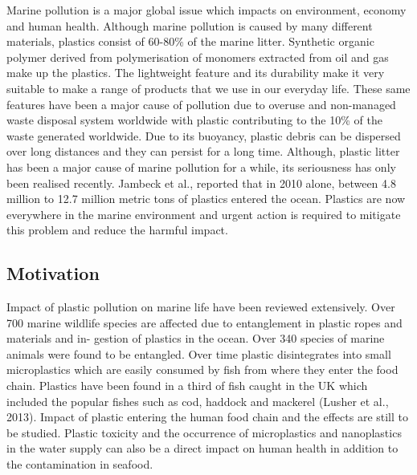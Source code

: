 \documentclass[10pt]{article}\usepackage[]{graphicx}\usepackage[]{color}
\begin{document}
Marine pollution is a major global issue which impacts on environment, economy and human health. Although marine pollution is caused by many different materials, plastics consist of 60-80\% of the marine litter. Synthetic organic polymer derived from polymerisation of monomers extracted from oil and gas make up the plastics.\cite{DERRAIK2002} \cite{RIOS2007} The lightweight feature and its durability make it very suitable to make a range of products that we use in our everyday life.\cite{BARNES2009} \cite{SIVAN2011} These same features have been a major cause of pollution due to overuse and non-managed waste disposal system worldwide with plastic contributing to the 10\% of the waste generated worldwide.\cite{BARNES2009} Due to its buoyancy, plastic debris can be dispersed over long distances and they can persist for a long time. Although, plastic litter has been a major cause of marine pollution for a while, its seriousness has only been realised recently. Jambeck et al.,\cite{JAMBECK2015} reported that in 2010 alone, between 4.8 million to 12.7 million metric tons of plastics entered the ocean. Plastics are now everywhere in the marine environment and urgent action is required to mitigate this problem and reduce the harmful impact.\cite{RIOS2007} \cite{ROCHMAN2015}



\subsection{Motivation}\label{mot}

Impact of plastic pollution on marine life have been reviewed extensively. \cite{GALL2015} \cite{KUHN2015} \cite{RYAN2015} \cite{WILLIAMS2019} Over 700 marine wildlife species are affected due to entanglement in plastic ropes and materials and in- gestion of plastics in the ocean.\cite{GALL2015} Over 340 species of marine animals were found to be entangled. \cite{KUHN2015} Over time plastic disintegrates into small microplastics which are easily consumed by fish from where they enter the food chain. Plastics have been found in a third of fish caught in the UK which included the popular fishes such as cod, haddock and mackerel (Lusher et al., 2013). Impact of plastic entering the human food chain and the effects are still to be studied. Plastic toxicity and the occurrence of microplastics and nanoplastics in the water supply can also be a direct impact on human health in addition to the contamination in seafood.\cite{ROCHMAN2015} \cite{MARKIC2020} \\
\end{document}
